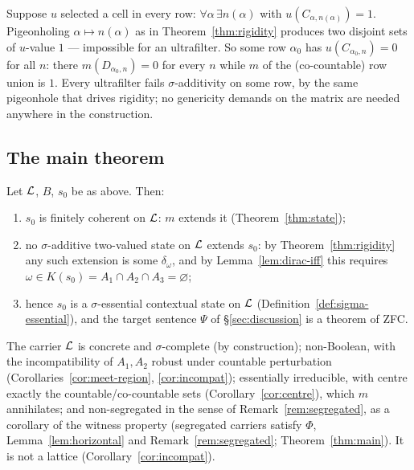 \begin{remark}\label{rem:self-witnessing}
Suppose $u$ selected a cell in every row: $\forall\alpha\,\exists n(\alpha)$
with $u(C_{\alpha,n(\alpha)})=1$. Pigeonholing $\alpha\mapsto n(\alpha)$ as in
Theorem~\ref{thm:rigidity} produces two disjoint sets of $u$-value $1$ ---
impossible for an ultrafilter. So some row $\alpha_0$ has
$u(C_{\alpha_0,n})=0$ for all $n$: there $m(D_{\alpha_0,n})=0$ for every $n$
while $m$ of the (co-countable) row union is $1$. Every ultrafilter fails
$\sigma$-additivity on some row, by the same pigeonhole that drives rigidity; no
genericity demands on the matrix are needed anywhere in the construction.
\end{remark}

\subsection{The main theorem}

\begin{theorem}\label{thm:main}
Let $\mathcal{L}$, $B$, $s_0$ be as above. Then:
\begin{enumerate}[label=\textup{(\arabic*)}]
  \item $s_0$ is finitely coherent on $\mathcal{L}$: $m$ extends it
    (Theorem~\ref{thm:state});
  \item no $\sigma$-additive two-valued state on $\mathcal{L}$ extends $s_0$: by
    Theorem~\ref{thm:rigidity} any such extension is some $\delta_\omega$, and by
    Lemma~\ref{lem:dirac-iff} this requires
    $\omega\in K(s_0)=A_1\cap A_2\cap A_3=\varnothing$;
  \item hence $s_0$ is a $\sigma$-essential contextual state on $\mathcal{L}$
    \textup{(Definition~\ref{def:sigma-essential})}, and the target sentence
    $\Psi$ of \S\ref{sec:discussion} is a theorem of ZFC.
\end{enumerate}
\end{theorem}

\begin{proposition}[admissibility]\label{prop:adm}
The carrier $\mathcal{L}$ is concrete and $\sigma$-complete (by construction);
non-Boolean, with the incompatibility of $A_1,A_2$ robust under countable
perturbation (Corollaries~\ref{cor:meet-region}, \ref{cor:incompat});
essentially irreducible, with centre exactly the countable/co-countable sets
(Corollary~\ref{cor:centre}), which $m$ annihilates; and non-segregated in the sense
of Remark~\ref{rem:segregated}, as a corollary of the witness property
(segregated carriers satisfy $\Phi$, Lemma~\ref{lem:horizontal} and
Remark~\ref{rem:segregated}; Theorem~\ref{thm:main}). It is not a lattice
(Corollary~\ref{cor:incompat}).
\end{proposition}


